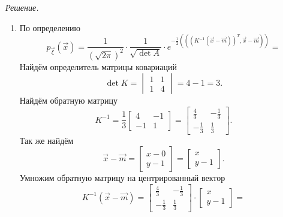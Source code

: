 \textit{Решение.}
\begin{enumerate}[label=\alph*)]
  \item По определению
  \begin{equation*}
    p_{ \vec{ \xi }} \left( \vec{x} \right) =
    \frac{1}{ \left( \sqrt{2 \pi } \right)^2} \cdot
    \frac{1}{ \sqrt{\det{A}}} \cdot
    e^{-\frac{1}{2} \left( \left( \left( K^{-1} \left( \vec{x} - \vec{m} \right) \right)^T, \vec{x} - \vec{m} \right) \right) } =
  \end{equation*}
  Найдём определитель матрицы ковариаций
  \begin{equation*}
    \det{K} =
    \begin{vmatrix}
      1 & 1 \\
      1 & 4
    \end{vmatrix} =
    4 - 1 =
    3.
  \end{equation*}
  Найдём обратную матрицу
  \begin{equation*}
    K^{-1} =
    \frac{1}{3} \begin{bmatrix}
      4 & -1 \\
      -1 & 1
    \end{bmatrix} =
    \begin{bmatrix}
      \frac{4}{3} & -\frac{1}{3} \\
      -\frac{1}{3} & \frac{1}{3}
    \end{bmatrix}.
  \end{equation*}
  Так же найдём
  \begin{equation*}
    \vec{x} - \vec{m} =
    \begin{bmatrix}
      x - 0 \\
      y - 1
    \end{bmatrix} =
    \begin{bmatrix}
      x \\
      y - 1
    \end{bmatrix}.
  \end{equation*}
  Умножим обратную матрицу на центрированный вектор
  \begin{equation*}
    K^{-1} \left( \vec{x} - \vec{m} \right) =
    \begin{bmatrix}
      \frac{4}{3} & -\frac{1}{3} \\
      -\frac{1}{3} & \frac{1}{3}
    \end{bmatrix} \cdot
    \begin{bmatrix}
      x \\
      y - 1
    \end{bmatrix} =

\end{equation*}
\end{enumerate}
